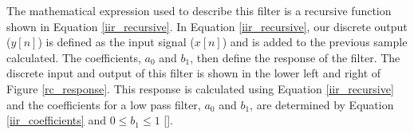 








The mathematical expression used to describe this filter is a recursive function shown in Equation \ref{iir_recursive}.  In Equation \ref{iir_recursive}, our discrete output ($y[n]$) is defined as the input signal ($x[n]$) and is added to the previous sample calculated.  The coefficients, $a_0$ and $b_1$, then define the response of the filter.  The discrete input and output of this filter is shown in the lower left and right of  Figure \ref{rc_response}.  This response is calculated using Equation \ref{iir_recursive} and the coefficients for a low pass filter, $a_0$ and $b_1$, are determined by Equation \ref{iir_coefficients} and $0 \leq b_1 \leq 1$ [\cite{smith1997scientist}].

